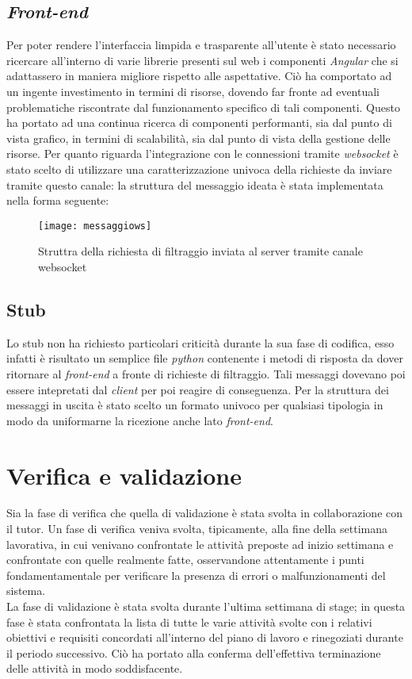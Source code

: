 \subsection{\textit{Front-end}}
Per poter rendere l'interfaccia limpida e trasparente all'utente è stato necessario ricercare all'interno di varie librerie presenti sul web i componenti \textit{Angular} che si adattassero in maniera migliore rispetto alle aspettative. Ciò ha comportato ad un ingente investimento in termini di risorse, dovendo far fronte ad eventuali problematiche riscontrate dal funzionamento specifico di tali componenti. Questo ha portato ad una continua ricerca di componenti performanti, sia dal punto di vista grafico, in termini di scalabilità, sia dal punto di vista della gestione delle risorse.
Per quanto riguarda l'integrazione con le connessioni tramite \textit{websocket} è stato scelto di utilizzare una caratterizzazione univoca della richieste da inviare tramite questo canale: la struttura del messaggio ideata è stata implementata nella forma seguente:
\begin{figure}[!h] 
	\centering 
	\texttt{[image: messaggiows]} 
	\caption{Struttra della richiesta di filtraggio inviata al server tramite canale websocket}
\end{figure}
\subsection{Stub}
Lo stub non ha richiesto particolari criticità durante la sua fase di codifica, esso infatti è risultato un semplice file \textit{python} contenente i metodi di risposta da dover ritornare al \textit{front-end} a fronte di richieste di filtraggio. Tali messaggi dovevano poi essere intepretati dal \textit{client} per poi reagire di conseguenza. Per la struttura dei messaggi in uscita è stato scelto un formato univoco per qualsiasi tipologia in modo da uniformarne la ricezione anche lato \textit{front-end}.
\section{Verifica e validazione}
Sia la fase di verifica che quella di validazione è stata svolta in collaborazione con il tutor. Un fase di verifica veniva svolta, tipicamente, alla fine della settimana lavorativa, in cui venivano confrontate le attività preposte ad inizio settimana e confrontate con quelle realmente fatte, osservandone attentamente i punti fondamentamentale per verificare la presenza di errori o malfunzionamenti del sistema.\\ La fase di validazione è stata svolta durante l'ultima settimana di stage; in questa fase è stata confrontata la lista di tutte le varie attività svolte con i relativi obiettivi e requisiti concordati all'interno del piano di lavoro e rinegoziati durante il periodo successivo. Ciò ha portato alla conferma dell'effettiva terminazione delle attività in modo soddisfacente. 

